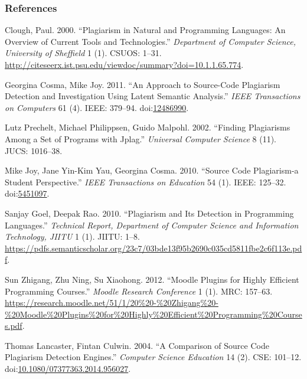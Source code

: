\documentclass[a4paper]{article}
\begin{document}
\subsubsection*{References}\label{references}

\hypertarget{refs}{}
\hypertarget{ref-Paul}{}
Clough, Paul. 2000. ``Plagiarism in Natural and Programming Languages:
An Overview of Current Tools and Technologies.'' \emph{Department of
Computer Science, University of Sheffield} 1 (1). CSUOS: 1--31.
\href{\%20http://citeseerx.ist.psu.edu/viewdoc/summary?doi=10.1.1.65.774}{http://citeseerx.ist.psu.edu/viewdoc/summary?doi=10.1.1.65.774}.

\hypertarget{ref-Mike_Joy_Cosma}{}
Georgina Cosma, Mike Joy. 2011. ``An Approach to Source-Code Plagiarism
Detection and Investigation Using Latent Semantic Analysis.'' \emph{IEEE
Transactions on Computers} 61 (4). IEEE: 379--94.
doi:\href{https://doi.org/12486990}{12486990}.

\hypertarget{ref-Lutz_Guido_Michal}{}
Lutz Prechelt, Michael Philippsen, Guido Malpohl. 2002. ``Finding
Plagiarisms Among a Set of Programs with Jplag.'' \emph{Universal
Computer Science} 8 (11). JUCS: 1016--38.

\hypertarget{ref-Mike_Cosma_Jane2}{}
Mike Joy, Jane Yin-Kim Yau, Georgina Cosma. 2010. ``Source Code
Plagiarism-a Student Perspective.'' \emph{IEEE Transactions on
Education} 54 (1). IEEE: 125--32.
doi:\href{https://doi.org/5451097}{5451097}.

\hypertarget{ref-Sanjay_Rao}{}
Sanjay Goel, Deepak Rao. 2010. ``Plagiarism and Its Detection in
Programming Languages.'' \emph{Technical Report, Department of Computer
Science and Information Technology, JIITU} 1 (1). JIITU: 1--8.
\href{\%20https://pdfs.semanticscholar.org/23c7/03bde13f95b2690c035cd5811fbe2c6f113e.pdf}{https://pdfs.semanticscholar.org/23c7/03bde13f95b2690c035cd5811fbe2c6f113e.pdf}.

\hypertarget{ref-Sun_su_zhu}{}
Sun Zhigang, Zhu Ning, Su Xiaohong. 2012. ``Moodle Plugins for Highly
Efficient Programming Courses.'' \emph{Moodle Research Conference} 1
(1). MRC: 157--63.
\href{\%20https://research.moodle.net/51/1/20\%20-\%20Zhigang\%20-\%20Moodle\%20Plugins\%20for\%20Highly\%20Efficient\%20Programming\%20Courses.pdf}{https://research.moodle.net/51/1/20\%20-\%20Zhigang\%20-\%20Moodle\%20Plugins\%20for\%20Highly\%20Efficient\%20Programming\%20Courses.pdf}.

\hypertarget{ref-Thomas_Fintan}{}
Thomas Lancaster, Fintan Culwin. 2004. ``A Comparison of Source Code
Plagiarism Detection Engines.'' \emph{Computer Science Education} 14
(2). CSE: 101--12.
doi:\href{https://doi.org/10.1080/07377363.2014.956027}{10.1080/07377363.2014.956027}.
\end{document}
